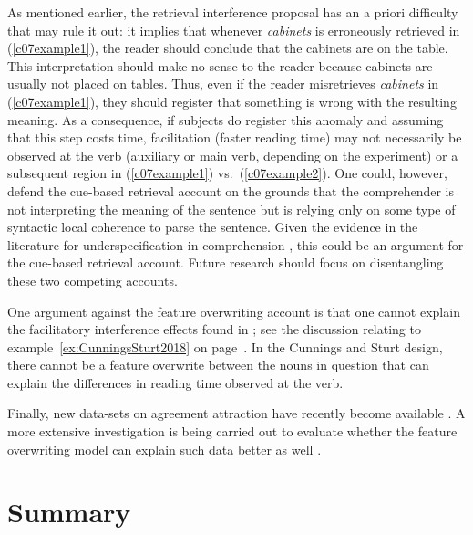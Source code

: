 \documentclass{cambridge7A}\usepackage[]{graphicx}\usepackage[]{color}
\begin{document}
As mentioned earlier, the retrieval interference proposal has an a priori difficulty that may rule it out: it implies that whenever \textit{cabinets} is erroneously retrieved in (\ref{c07example1}), the reader should conclude that the cabinets are on the table. This interpretation should make no sense to the reader because cabinets are usually not placed on tables.  Thus, even if the reader misretrieves \textit{cabinets} in (\ref{c07example1}), they should register that something is wrong with the resulting meaning. As a consequence, if subjects do register this anomaly and assuming that this step costs time, facilitation (faster reading time) may not necessarily be observed at the verb (auxiliary or main verb, depending on the experiment) or a subsequent region in (\ref{c07example1}) vs.\ (\ref{c07example2}). 
One could, however, defend the cue-based retrieval account on the grounds that the comprehender is not interpreting the meaning of the sentence but is relying only on some type of syntactic local coherence \citep{taboretal04}  to parse the sentence. Given the evidence in the literature for underspecification   in comprehension \citep{SwetsDesmetClifton2008,MalsburgVasishth2013}, this could be an argument for the cue-based retrieval account. Future research should focus on disentangling these two competing accounts.  

One argument against the feature overwriting account is that one cannot explain the facilitatory interference effects found in \cite{CunningsSturt2018}; see the discussion relating to example~\ref{ex:CunningsSturt2018} on page~\pageref{ex:CunningsSturt2018}. In the Cunnings and Sturt design, there cannot be a feature overwrite between the nouns in question that can explain the differences in reading time observed at the verb. 

Finally, new data-sets on agreement attraction have recently become available \citep{ALV2020,JaegerMertzenVanDykeVasishth2019}. A more extensive investigation is being carried out to evaluate whether the feature overwriting model can explain such data better as well \citep{PaapeEtAlMPT2020}.   

\section{Summary}
\end{document}
